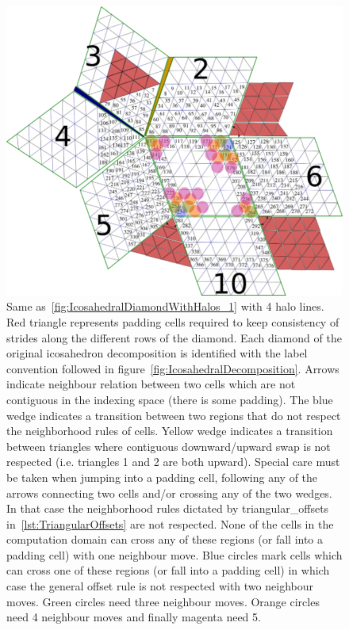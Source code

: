\documentclass{book}
\begin{document}
\begin{figure}[htb!]
	\begin{center}
		\includegraphics[width=18cm]{fig/IcosahedralGridCellHalos8_v2.png}
		\caption{
		Same as~\autoref{fig:IcosahedralDiamondWithHalos_1} with 4 halo lines. 
		Red triangle represents padding cells required to keep consistency of strides
		along the different rows of the diamond. Each diamond of the original icosahedron 
		decomposition is identified with the label convention followed in figure~\ref{fig:IcosahedralDecomposition}.
		Arrows indicate neighbour relation between two cells which are not contiguous in the indexing space (there is some padding).
		The blue wedge indicates a transition between two regions that do
		not respect the neighborhood rules of cells.
		Yellow wedge indicates a transition between triangles where 
		contiguous downward/upward swap is not respected (i.e. triangles 1 and 2 are both upward). Special care must be taken when jumping into a padding cell, following any of the arrows connecting two cells and/or crossing any of the two wedges. In that case the neighborhood rules dictated by triangular\_offsets in~\autoref{lst:TriangularOffsets} are not respected.
		None of the cells in the computation domain can cross any of
		these regions (or fall into a padding cell) with one neighbour move. 
		Blue circles mark cells which can cross one of these regions (or fall into a padding cell) in which case the general offset rule is not respected with two neighbour moves.
		Green circles need three neighbour moves. Orange circles need 4 neighbour moves and finally magenta need 5. 
		}
		\label{fig:IcosahedralDiamondWithHalos_4}
	\end{center}
\end{figure}
\end{document}
